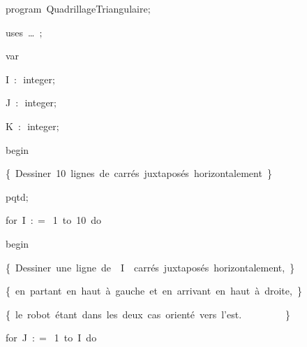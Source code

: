 
{
\parindent {}
\medskip

\carrenoir
\vspace{\neglskip}\mbox{\blc  \idt  \mcl program\idt \ QuadrillageTriangulaire$;$
}\par 
\vspace{\neglskip}\mbox{\blc \blk\idt \mcl uses\idt \ \ldots\ $;$
}\par 
\medskip

\pagebreak[3] 
\vspace{\neglskip}\mbox{\blc  \idt  \mcl var\idt }\par 
\vspace{\neglskip}\mbox{\blc  \blk\idt  I\ $:$\ integer$;$\ }\par 
\vspace{\neglskip}\mbox{\blc  \blk\idt  J\ $:$\ integer$;$}\par 
\vspace{\neglskip}\mbox{\blc  \blk\idt  K\ $:$\ integer$;$}\par 
\vspace{\neglskip}\mbox{\blc  \idt  \mcl begin\idt }\par 
\vspace{\neglskip}\mbox{\blc  \blk\idt  \cmt  \{\ Dessiner\ 10\ lignes\ de\ carrés\ juxtaposés\ horizontalement\ \}\idt }\par 
\vspace{\neglskip}\mbox{\blc  \blk\idt  pqtd$;$\ }\par 
\pagebreak[3] 
\vspace{\neglskip}\mbox{\blc  \blk\idt  \mcl for\idt \ I\ $:$$=$\ 1\ \mcl to\idt \ 10\ \mcl do\idt }\par 
\vspace{\neglskip}\mbox{\blc  \blk\blk\idt  \mcl begin\idt }\par 
\vspace{\neglskip}\mbox{\blc  \blk\blk\blk\idt  \cmt  \{\ Dessiner\ une\ ligne\ de\ \ I\ \ carrés\ juxtaposés\ horizontalement,\ \}\idt }\par 
\vspace{\neglskip}\mbox{\blc  \blk\blk\blk\idt  \cmt  \{\ en\ partant\ en\ haut\ à\ gauche\ et\ en\ arrivant\ en\ haut\ à\ droite,\ \}\idt }\par 
\vspace{\neglskip}\mbox{\blc  \blk\blk\blk\idt  \cmt  \{\ le\ robot\ étant\ dans\ les\ deux\ cas\ orienté\ vers\ l{'}est.\ \ \ \ \ \ \ \ \ \}\idt }\par 
\pagebreak[3] 
\vspace{\neglskip}\mbox{\blc  \blk\blk\blk\idt  \mcl for\idt \ J\ $:$$=$\ 1\ \mcl to\idt \ I\ \mcl do\idt }\par 
}
